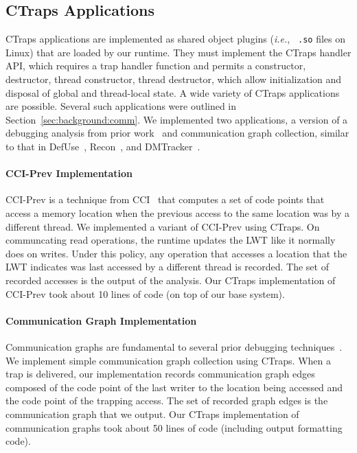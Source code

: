 \documentclass[preprint,9pt]{sigplanconf}
\newcommand{\ctraps}{CTraps\xspace}
\begin{document}
\subsection{\ctraps Applications}
\label{sec:apps}
\ctraps applications are implemented as shared object plugins ({\em i.e.}, {\tt
.so} files on Linux) that are loaded by our runtime.  They must implement the
\ctraps handler API, which requires a trap handler function and permits a
constructor, destructor,  thread constructor,  thread destructor, which allow
initialization and disposal of global and thread-local state.  A wide variety
of \ctraps applications are possible.  Several such applications were outlined
in Section~\ref{sec:background:comm}.    We implemented two applications, a
version of a debugging analysis from prior work~\cite{cci} and communication
graph collection, similar to that in DefUse~\cite{defuse}, Recon~\cite{recon},
and DMTracker~\cite{dmtracker}.

\paragraph{CCI-Prev Implementation}
CCI-Prev is a technique from CCI~\cite{cci} that computes a set of code points
that access a memory location when the previous access to the same location was
by a different thread.  We implemented a variant of CCI-Prev using \ctraps.  On
communcating read operations, the runtime updates the LWT like it normally does
on writes.  Under this policy, any operation that accesses a location that the
LWT indicates was last accessed by a different thread is recorded.  The set of
recorded accesses is the output of the analysis.  Our \ctraps implementation of
CCI-Prev took about 10 lines of code (on top of our base system). 

\paragraph{Communication Graph Implementation}
Communication graphs are fundamental to several prior debugging
techniques~\cite{recon, bugaboo, defuse}.  We implement simple communication
graph collection using \ctraps.  When a trap is delivered, our implementation records
communication graph edges composed of the code point of the last writer to the
location being accessed and the code point of the trapping access.  The set of
recorded graph edges is the communication graph that we output.  Our \ctraps
implementation of communication graphs took about 50 lines of code (including
output formatting code). 
\end{document}
